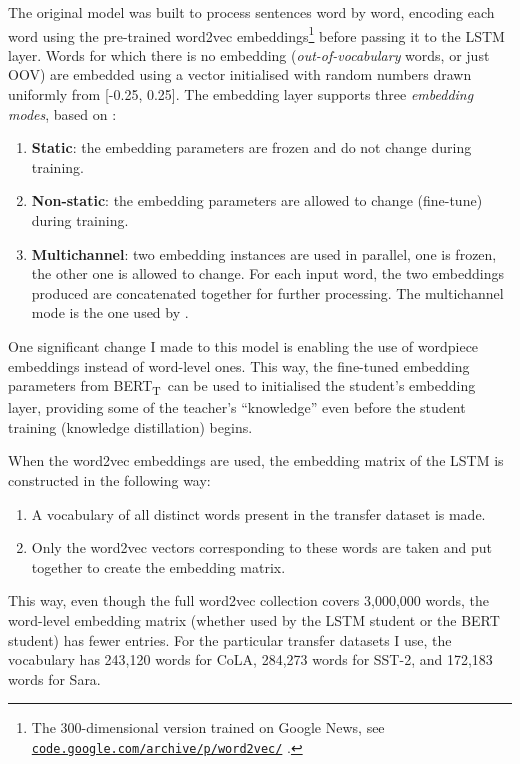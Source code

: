 \documentclass[bsc,frontabs,twoside,singlespacing,parskip,deptreport]{infthesis}
\def\BERTT{BERT\textsubscript{T}}
\newcommand\rurl[1]{%
  \href{https://#1}{\nolinkurl{#1}}%
}
\begin{document}
{{{      The original model was built to process sentences word by word, encoding each word using the pre-trained word2vec embeddings\footnote{The 300-dimensional version trained on Google News, see \rurl{code.google.com/archive/p/word2vec/}.} before passing it to the LSTM layer. Words for which there is no embedding (\textit{out-of-vocabulary} words, or just OOV) are embedded using a vector initialised with random numbers drawn uniformly from [-0.25, 0.25]. The embedding layer supports three \textit{embedding modes}, based on \citet{Kim_2014}:
      \begin{enumerate}
        \item \textbf{Static}: the embedding parameters are frozen and do not change during training.
        \item \textbf{Non-static}: the embedding parameters are allowed to change (fine-tune) during training.
        \item \textbf{Multichannel}: two embedding instances are used in parallel, one is frozen, the other one is allowed to change. For each input word, the two embeddings produced are concatenated together for further processing. The multichannel mode is the one used by \citeauthor{Tang_2019b}.
      \end{enumerate}

      One significant change I made to this model is enabling the use of wordpiece embeddings instead of word-level ones. This way, the fine-tuned embedding parameters from \BERTT~can be used to initialised the student's embedding layer, providing some of the teacher's ``knowledge'' even before the student training (knowledge distillation) begins.

      When the word2vec embeddings are used, the embedding matrix of the LSTM is constructed in the following way:
      \begin{enumerate}
        \item A vocabulary of all distinct words present in the transfer dataset is made.
        \item Only the word2vec vectors corresponding to these words are taken and put together to create the embedding matrix.
      \end{enumerate}
      This way, even though the full word2vec collection covers 3,000,000 words, the word-level embedding matrix (whether used by the LSTM student or the BERT student) has fewer entries. For the particular transfer datasets I use, the vocabulary has 243,120 words for CoLA, 284,273 words for SST-2, and 172,183 words for Sara.

}}}
\end{document}

